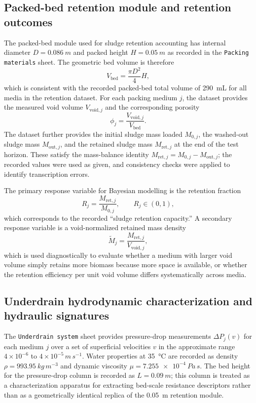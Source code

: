 \documentclass[11pt]{article}
\begin{document}
\subsection{Packed-bed retention module and retention outcomes}
The packed-bed module used for sludge retention accounting has internal diameter $D=\SI{0.086}{m}$ and packed height $H=\SI{0.05}{m}$ as recorded in the \texttt{Packing materials} sheet. The geometric bed volume is therefore
\begin{equation}
V_{\mathrm{bed}}=\frac{\pi D^2}{4}H,
\end{equation}
which is consistent with the recorded packed-bed total volume of \SI{290}{mL} for all media in the retention dataset. For each packing medium $j$, the dataset provides the measured void volume $V_{\mathrm{void},j}$ and the corresponding porosity
\begin{equation}
\phi_j=\frac{V_{\mathrm{void},j}}{V_{\mathrm{bed}}}.
\end{equation}
The dataset further provides the initial sludge mass loaded $M_{0,j}$, the washed-out sludge mass $M_{\mathrm{out},j}$, and the retained sludge mass $M_{\mathrm{ret},j}$ at the end of the test horizon. These satisfy the mass-balance identity $M_{\mathrm{ret},j}=M_{0,j}-M_{\mathrm{out},j}$; the recorded values were used as given, and consistency checks were applied to identify transcription errors.

The primary response variable for Bayesian modelling is the retention fraction
\begin{equation}
R_j=\frac{M_{\mathrm{ret},j}}{M_{0,j}}, \qquad R_j\in(0,1),
\end{equation}
which corresponds to the recorded ``sludge retention capacity.'' A secondary response variable is a void-normalized retained mass density
\begin{equation}
\tilde{M}_j=\frac{M_{\mathrm{ret},j}}{V_{\mathrm{void},j}},
\end{equation}
which is used diagnostically to evaluate whether a medium with larger void volume simply retains more biomass because more space is available, or whether the retention efficiency per unit void volume differs systematically across media.

\subsection{Underdrain hydrodynamic characterization and hydraulic signatures}
The \texttt{Underdrain system} sheet provides pressure-drop measurements $\Delta P_{j}(v)$ for each medium $j$ over a set of superficial velocities $v$ in the approximate range $4\times 10^{-6}$ to $4\times 10^{-5}\,\si{m\,s^{-1}}$. Water properties at \SI{35}{\celsius} are recorded as density $\rho=\SI{993.95}{kg\,m^{-3}}$ and dynamic viscosity $\mu=\SI{7.255e-4}{Pa\,s}$. The bed height for the pressure-drop column is recorded as $L=\SI{0.09}{m}$; this column is treated as a characterization apparatus for extracting bed-scale resistance descriptors rather than as a geometrically identical replica of the \SI{0.05}{m} retention module.
\end{document}
